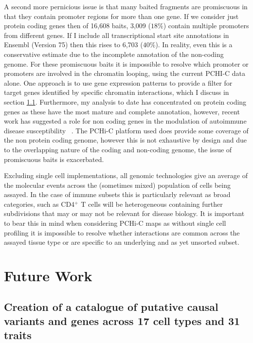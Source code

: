 \documentclass[a4paper,11pt]{report}
\begin{document}
A second more pernicious issue is that many baited fragments are promiscuous in that they contain promoter regions for more than one gene. If we consider just protein coding genes then of 16,608 baits, 3,009 ($18\%$) contain multiple promoters from different genes. If I include all transcriptional start site annotations in Ensembl (Version 75) then this rises to 6,703 ($40\%$). In reality, even this is a conservative estimate due to the incomplete annotation of the non-coding genome. For these promiscuous baits it is impossible to resolve which promoter or promoters are involved in the chromatin looping, using the current PCHI-C data alone. One approach is to use gene expression patterns to provide a filter for target genes identified by specific chromatin interactions, which I discuss in section \ref{sect:mo_celltypes}. Furthermore, my analysis to date has concentrated on protein coding genes as these have the most mature and complete annotation, however,  recent work has suggested a role for non coding genes in the modulation of autoimmune disease susceptibility ~\citep{Castellanos-RubioFernandez-JimenezKratchmarovEtAl2016}. The PCHi-C platform used does provide some coverage of the non protein coding genome, however this is not exhaustive by design and due to the overlapping nature of the coding and non-coding genome, the issue of promiscuous baits is exacerbated.

Excluding single cell implementations, all genomic technologies give an average of the molecular events across the (sometimes mixed) population of cells being assayed. In the case of immune subsets this is particularly relevant as broad categories, such as CD4$^{+}$ T cells will be heterogeneous containing further subdivisions that may or may not be relevant for disease biology. It is important to bear this in mind when considering PCHi-C maps as without single cell profiling it is impossible to resolve whether interactions are common across the assayed tissue type or are specific to an underlying and as yet unsorted subset.



\chapter{Future Work}

\section{Creation of a catalogue of putative causal variants and genes across 17 cell types and 31 traits}
\label{sect:mo_celltypes}
\end{document}
